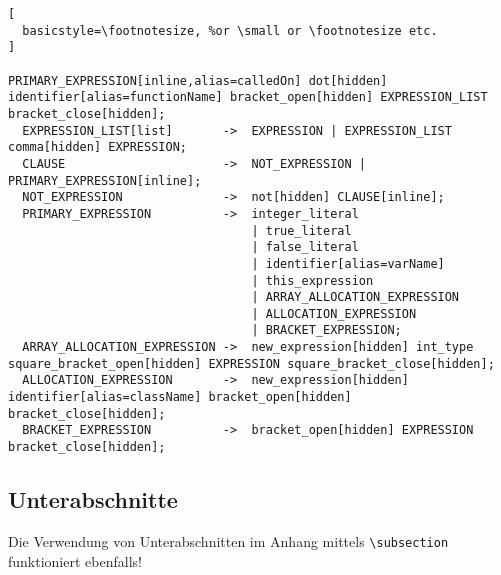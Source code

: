 \begin{lstlisting}[
  basicstyle=\footnotesize, %or \small or \footnotesize etc.
]
                                  PRIMARY_EXPRESSION[inline,alias=calledOn] dot[hidden] identifier[alias=functionName] bracket_open[hidden] EXPRESSION_LIST bracket_close[hidden];
  EXPRESSION_LIST[list]       ->  EXPRESSION | EXPRESSION_LIST comma[hidden] EXPRESSION;
  CLAUSE                      ->  NOT_EXPRESSION | PRIMARY_EXPRESSION[inline];
  NOT_EXPRESSION              ->  not[hidden] CLAUSE[inline];
  PRIMARY_EXPRESSION          ->  integer_literal
                                  | true_literal
                                  | false_literal
                                  | identifier[alias=varName]
                                  | this_expression
                                  | ARRAY_ALLOCATION_EXPRESSION
                                  | ALLOCATION_EXPRESSION
                                  | BRACKET_EXPRESSION;
  ARRAY_ALLOCATION_EXPRESSION ->  new_expression[hidden] int_type square_bracket_open[hidden] EXPRESSION square_bracket_close[hidden];
  ALLOCATION_EXPRESSION       ->  new_expression[hidden] identifier[alias=className] bracket_open[hidden] bracket_close[hidden];
  BRACKET_EXPRESSION          ->  bracket_open[hidden] EXPRESSION bracket_close[hidden];
\end{lstlisting}

  \subsection{Unterabschnitte}
  Die Verwendung von Unterabschnitten im Anhang
  mittels \texttt{\textbackslash subsection}
  funktioniert ebenfalls!
